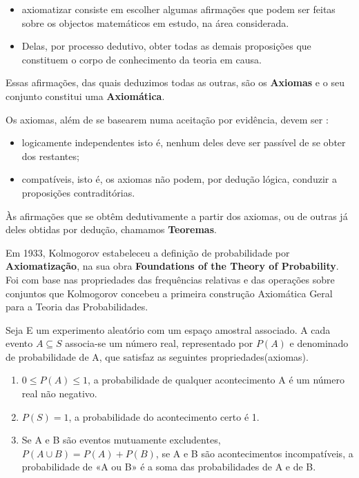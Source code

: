 \documentclass[a4paper,12pt]{report}
\begin{document}
{\begin{itemize}
    \item axiomatizar consiste em escolher algumas afirmações que podem ser
feitas sobre os objectos matemáticos em estudo, na área
considerada.
    \item Delas, por processo dedutivo, obter todas as demais proposições que constituem o corpo de conhecimento da teoria em causa.
\end{itemize}

Essas afirmações, das quais deduzimos todas as outras, são os
\textbf{Axiomas} e o seu conjunto constitui uma
\textbf{Axiomática}.\vskip0.3cm

Os axiomas, além de se basearem numa aceitação por evidência,
devem ser :

\begin{itemize}
    \item logicamente independentes isto é, nenhum deles deve ser passível de se obter dos restantes;
    \item compatíveis, isto é, os axiomas não podem, por dedução lógica, conduzir a proposições contraditórias.
\end{itemize}

Às afirmações que se obtêm dedutivamente a partir dos axiomas, ou
de outras já deles obtidas por dedução, chamamos
\textbf{Teoremas}.\vskip0.3cm



Em 1933, Kolmogorov estabeleceu a definição de probabilidade por
\textbf{Axiomatização}, na sua obra \textbf{Foundations of the
Theory of Probability}. Foi com base nas propriedades das
frequências relativas e das operações sobre conjuntos que
Kolmogorov concebeu a primeira construção Axiomática Geral para a
Teoria das Probabilidades.\vskip0.3cm


Seja E um experimento aleatório com um espaço amostral associado.
A cada evento $A \subseteq S$ associa-se um número real,
representado por $P(A)$ e denominado de probabilidade de A, que
satisfaz as seguintes propriedades(axiomas).

\begin{enumerate}
    \item $0 \leq P(A) \leq 1$, a probabilidade de qualquer acontecimento A é um número real não
negativo.
    \item $P(S)=1$, a probabilidade do acontecimento certo é 1.

     \item Se A e B são eventos mutuamente excludentes, $P(A \cup
     B)=P(A)+P(B)$, se A e B são acontecimentos incompatíveis, a probabilidade de «A
ou B» é a soma das probabilidades de A e de B.


\end{enumerate}}
\end{document}
